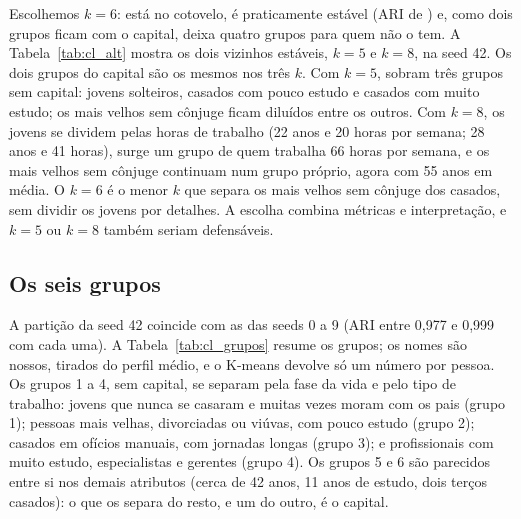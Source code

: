 Escolhemos $k = 6$: está no cotovelo, é praticamente estável (ARI de \clAriSeis) e, como dois grupos ficam com o capital, deixa quatro grupos para quem não o tem. A Tabela~\ref{tab:cl_alt} mostra os dois vizinhos estáveis, $k = 5$ e $k = 8$, na seed 42. Os dois grupos do capital são os mesmos nos três $k$. Com $k = 5$, sobram três grupos sem capital: jovens solteiros, casados com pouco estudo e casados com muito estudo; os mais velhos sem cônjuge ficam diluídos entre os outros. Com $k = 8$, os jovens se dividem pelas horas de trabalho (22 anos e 20 horas por semana; 28 anos e 41 horas), surge um grupo de quem trabalha 66 horas por semana, e os mais velhos sem cônjuge continuam num grupo próprio, agora com 55 anos em média. O $k = 6$ é o menor $k$ que separa os mais velhos sem cônjuge dos casados, sem dividir os jovens por detalhes. A escolha combina métricas e interpretação, e $k = 5$ ou $k = 8$ também seriam defensáveis.

\begin{table}[ht]
\centering
\caption{As alternativas estáveis: perfis com $k = 5$ e $k = 8$ (seed 42), com os grupos ordenados pelo \% acima de 50 mil.}
\label{tab:cl_alt}
\scriptsize

\end{table}

\subsection{Os seis grupos}\label{sec:cl_grupos}

A partição da seed 42 coincide com as das seeds 0 a 9 (ARI entre 0,977 e 0,999 com cada uma). A Tabela~\ref{tab:cl_grupos} resume os grupos; os nomes são nossos, tirados do perfil médio, e o K-means devolve só um número por pessoa. Os grupos 1 a 4, sem capital, se separam pela fase da vida e pelo tipo de trabalho: jovens que nunca se casaram e muitas vezes moram com os pais (grupo 1); pessoas mais velhas, divorciadas ou viúvas, com pouco estudo (grupo 2); casados em ofícios manuais, com jornadas longas (grupo 3); e profissionais com muito estudo, especialistas e gerentes (grupo 4). Os grupos 5 e 6 são parecidos entre si nos demais atributos (cerca de 42 anos, 11 anos de estudo, dois terços casados): o que os separa do resto, e um do outro, é o capital.

\begin{table}[ht]
\centering
\caption{Perfil dos seis grupos ($k = 6$, seed 42): médias dos numéricos, \% de casados, a ocupação mais comum (com a sua parte no grupo) e \% acima de 50 mil.}
\label{tab:cl_grupos}
\scriptsize

\end{table}

